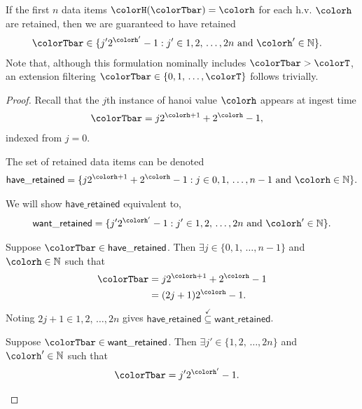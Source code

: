 \begin{lemma}
\label{thm:retained-equivalence-stretched}
If the first $n$ data items $\colorH(\colorTbar) = \colorh$ for each h.v. $\colorh$ are retained, then we are guaranteed to have retained
\begin{align*}
\colorTbar
&\in
\{
  j'2^{\colorh'} - 1
  :
  j' \in 1,2,\,\ldots,2n
  \text{ and }
  \colorh' \in \mathbb{N}
\}.
\end{align*}
Note that, although this formulation nominally includes $\colorTbar > \colorT$, an extension filtering $\colorTbar \in \{0,1,\,\ldots,\colorT\}$ follows trivially.
\end{lemma}
\begin{proof}

Recall that the $j$th instance of hanoi value $\colorh$ appears at ingest time
\begin{align*}
\colorTbar
&= j2^{\colorh + 1} + 2^{\colorh} - 1,
\end{align*}
indexed from $j=0$.

The set of retained data items can be denoted
\begin{align*}
\mathsf{have\_retained} =
\{
  j2^{\colorh + 1} + 2^{\colorh} - 1
  :
  j \in 0,1,\,\ldots,n-1
  \text{ and }
  \colorh \in \mathbb{N}
\}.
\end{align*}

We will show $\mathsf{have\_retained}$ equivalent to,
\begin{align*}
\mathsf{want\_retained} =
\{
  j'2^{\colorh'} - 1
  :
  j' \in 1,2,\,\ldots,2n
  \text{ and }
  \colorh' \in \mathbb{N}
\}.
\end{align*}

\begin{proofpart}
Suppose $\colorTbar \in \mathsf{have\_retained}$.
Then $\exists j \in \{0,1,\,\ldots,n-1\}$ and $\colorh \in \mathbb{N}$ such that
\begin{align*}
\colorTbar
&= j2^{\colorh + 1} + 2^{\colorh} - 1\\
&= (2j + 1)2^{\colorh} - 1.
\end{align*}
Noting $2j + 1 \in 1,2,\,\ldots,2n$ gives $\mathsf{have\_retained} \stackrel{\checkmark}{\subseteq} \mathsf{want\_retained}$.
\end{proofpart}

\begin{proofpart}
Suppose $\colorTbar \in \mathsf{want\_retained}$.
Then $\exists j'\in\{1,2,\,\ldots,2n\}$ and $\colorh' \in \mathbb{N}$ such that
\begin{align*}
\colorTbar
&= j'2^{\colorh'} - 1.
\end{align*}


\end{proofpart}
\end{proof}
